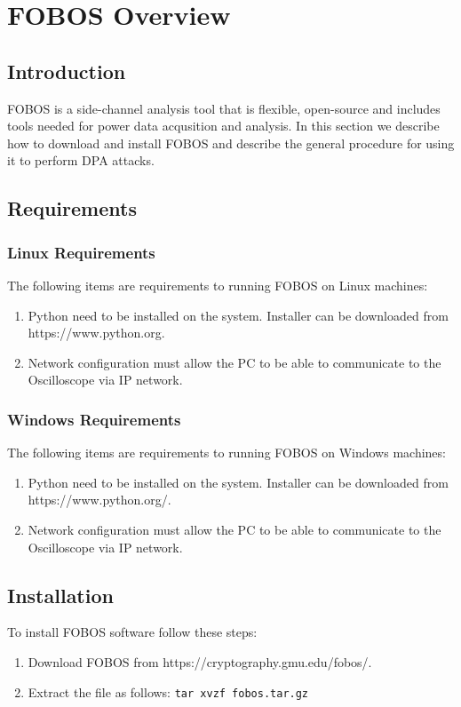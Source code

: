 \chapter{FOBOS Overview}
\section{Introduction}
FOBOS is a side-channel analysis tool that is flexible, open-source and includes tools needed for power data acqusition and analysis.
In this section we describe how to download and install FOBOS and describe the general procedure for using it to perform DPA attacks.

\section{Requirements}

\subsection{Linux Requirements}
The following items are requirements to running FOBOS on Linux machines:
\begin{enumerate}
\item Python need to be installed on the system. Installer can be downloaded from https://www.python.org.
\item Network configuration must allow the PC to be able to communicate to the Oscilloscope via IP network.
\end{enumerate}

\subsection{Windows Requirements}
The following items are requirements to running FOBOS on Windows machines:
\begin{enumerate}
\item Python need to be installed on the system. Installer can be downloaded from https://www.python.org/.
\item Network configuration must allow the PC to be able to communicate to the Oscilloscope via IP network.
\end{enumerate}


\section{Installation}
To install FOBOS software follow these steps:
\begin{enumerate}
\item Download FOBOS from https://cryptography.gmu.edu/fobos/.
\item Extract the file as follows: \newline
\texttt{tar xvzf fobos.tar.gz}
\end{enumerate}

